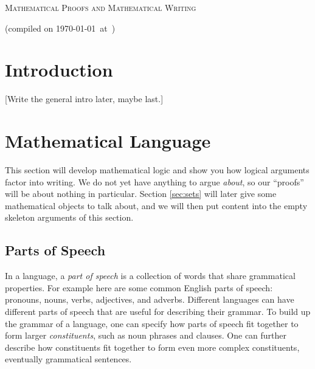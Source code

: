 \documentclass[12pt]{article}
\newcommand{\note}[1]{[#1]}
\begin{document}
\begin{center} {\Large \scshape Mathematical Proofs and Mathematical Writing}
\end{center}
(compiled on \today\ at\ \currenttime)
\hfill

\tableofcontents

\section{Introduction}


\note{Write the general intro later, maybe last.}



\section{Mathematical Language}
\label{sec:logic}

This section will develop mathematical logic and show you how logical arguments factor into writing.
We do not yet have anything to argue \emph{about}, so our ``proofs'' will be about nothing in particular.
Section \ref{sec:sets} will later give some mathematical objects to talk about, and we will then put
content into the empty skeleton arguments of this section.

\subsection{Parts of Speech}
\label{sec:parts_of_speech}

In a language, a \emph{part of speech} is a collection of words that share grammatical properties.
For example here are some common English parts of speech: pronouns, nouns, verbs, adjectives, and adverbs.
Different languages can have different parts of speech that are useful for describing their grammar.
To build up the grammar of a language, one can specify how parts of speech fit together to form larger
\emph{constituents}, such as noun phrases and clauses. One can further describe how
constituents fit together to form even more complex constituents, eventually grammatical sentences.
\end{document}
